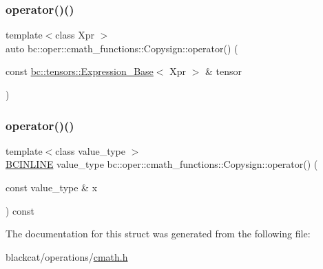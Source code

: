 \mbox{\label{structbc_1_1oper_1_1cmath__functions_1_1Copysign_a7890274550d1904541a414597d5fecb2}} 
\subsubsection{\texorpdfstring{operator()()}{operator()()}\hspace{0.1cm}{\footnotesize\ttfamily [2/3]}}
{\footnotesize\ttfamily template$<$class Xpr $>$ \\
auto bc\+::oper\+::cmath\+\_\+functions\+::\+Copysign\+::operator() (\begin{DoxyParamCaption}\item[{const \hyperlink{classbc_1_1tensors_1_1Expression__Base}{bc\+::tensors\+::\+Expression\+\_\+\+Base}$<$ Xpr $>$ \&}]{tensor }\end{DoxyParamCaption})\hspace{0.3cm}{\ttfamily [inline]}}

\mbox{\label{structbc_1_1oper_1_1cmath__functions_1_1Copysign_a07ad3634954a0cade8de41554b4b5a3b}} 
\subsubsection{\texorpdfstring{operator()()}{operator()()}\hspace{0.1cm}{\footnotesize\ttfamily [3/3]}}
{\footnotesize\ttfamily template$<$class value\+\_\+type $>$ \\
\hyperlink{common_8h_a6699e8b0449da5c0fafb878e59c1d4b1}{B\+C\+I\+N\+L\+I\+NE} value\+\_\+type bc\+::oper\+::cmath\+\_\+functions\+::\+Copysign\+::operator() (\begin{DoxyParamCaption}\item[{const value\+\_\+type \&}]{x }\end{DoxyParamCaption}) const\hspace{0.3cm}{\ttfamily [inline]}}



The documentation for this struct was generated from the following file\+:\begin{DoxyCompactItemize}
\item 
blackcat/operations/\hyperlink{cmath_8h}{cmath.\+h}\end{DoxyCompactItemize}
